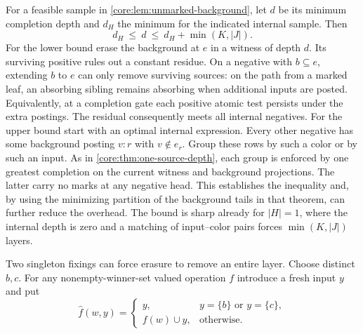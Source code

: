For a feasible sample in \cref{core:lem:unmarked-background}, let $d$
be its minimum completion depth and $d_H$ the minimum for the indicated
internal sample. Then
\[
                  d_H\ \le\ d\ \le\ d_H+\min(K,|J|).
\]
For the lower bound erase the background at $e$ in a witness of depth
$d$. Its surviving positive rules out a constant residue. On a negative
with $b\subseteq e$, extending $b$ to $e$ can only remove surviving
sources: on the path from a marked leaf, an absorbing sibling remains
absorbing when additional inputs are posted. Equivalently, at a
completion gate each positive atomic test persists under the extra
postings. The residual consequently meets all internal negatives.
For the upper bound start with an optimal internal expression.
Every other negative has some background posting $v:r$ with
$v\notin e_r$. Group these rows by such a color or by such an input.
As in \cref{core:thm:one-source-depth}, each group is enforced by one
greatest completion on the current witness and background projections.
The latter carry no marks at any negative head. This establishes the
inequality and, by using the minimizing partition of the background
tails in that theorem, can further reduce the overhead. The bound is
sharp already for $|H|=1$, where the internal depth is zero and a
matching of input--color pairs forces $\min(K,|J|)$ layers.

Two singleton fixings can force erasure to remove an entire layer.
Choose distinct $b,c$. For any nonempty-winner-set valued operation
$f$ introduce a fresh input $y$ and put
\[
 \widehat f(w,y)=
 \begin{cases}
  y,&y=\{b\}\text{ or }y=\{c\},\\
  f(w)\cup y,&\text{otherwise}.
 \end{cases}
\]

